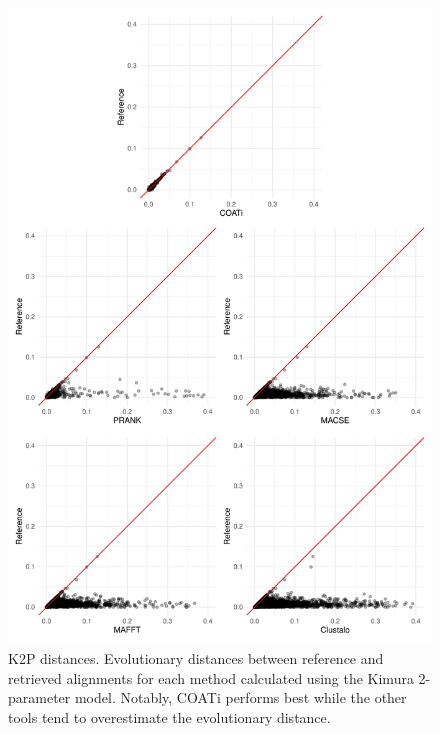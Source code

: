 \documentclass[
]{article}
\begin{document}
\begin{figure}
\centering
\includegraphics{figures/k2p_distances.pdf}
\caption{\label{fig:k2p} K2P distances. Evolutionary distances between
reference and retrieved alignments for each method calculated using the
Kimura 2-parameter model. Notably, COATi performs best while the other
tools tend to overestimate the evolutionary distance.}
\end{figure}
\end{document}
